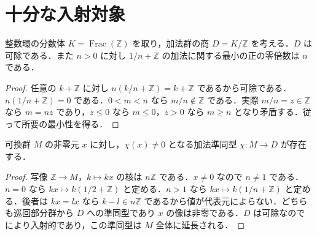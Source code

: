\section{十分な入射対象}
\begin{prop}[分数体の加法商の可除性]
整数環の分数体 $K=\operatorname{Frac}(\mathbb Z)$ を取り，加法群の商 $D=K/\mathbb Z$ を考える．$D$ は可除である．また $n>0$ に対し $1/n+\mathbb Z$ の加法に関する最小の正の零倍数は $n$ である．
\end{prop}
\begin{proof}
任意の $k+\mathbb Z$ に対し $n(k/n+\mathbb Z)=k+\mathbb Z$ であるから可除である．$n(1/n+\mathbb Z)=0$ である．$0<m<n$ なら $m/n\notin\mathbb Z$ である．実際 $m/n=z\in\mathbb Z$ なら $m=nz$ であり，$z\leq0$ なら $m\leq0$，$z>0$ なら $m\geq n$ となり矛盾する．従って所要の最小性を得る．
\end{proof}
\begin{prop}[整数加群の指標による分離]
可換群 $M$ の非零元 $x$ に対し，$\chi(x)\ne0$ となる加法準同型 $\chi:M\to D$ が存在する．
\end{prop}
\begin{proof}
写像 $\mathbb Z\to M$，$k\mapsto kx$ の核は $n\mathbb Z$ である．$x\ne0$ なので $n\ne1$ である．$n=0$ なら $kx\mapsto k(1/2+\mathbb Z)$ と定める．$n>1$ なら $kx\mapsto k(1/n+\mathbb Z)$ と定める．後者は $kx=lx$ なら $k-l\in n\mathbb Z$ であるから値が代表元によらない．どちらも巡回部分群から $D$ への準同型であり $x$ の像は非零である．$D$ は可除なので  により入射的であり，この準同型は $M$ 全体に延長される．
\end{proof}
